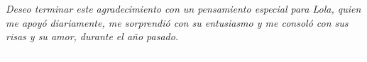 \begin{acknowledgements}
\vfill{}

%
%
\emph{Deseo terminar este agradecimiento con un pensamiento especial para Lola, quien me apoyó diariamente, me sorprendió con su entusiasmo y me consoló con sus risas y su amor, durante el año pasado.}\\
\indent
\textcolor{white}{$\heartsuit$ Te quiero, Lola, ¿quieres vivir conmigo?}

\end{acknowledgements}

